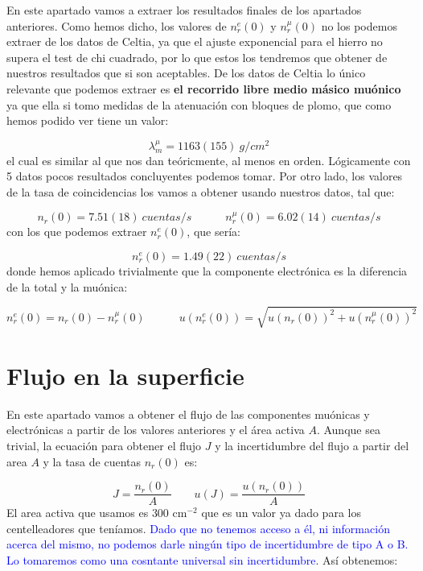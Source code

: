 \documentclass[11pt]{article}
\newcommand{\tquad}{\quad \quad \quad}
\begin{document}
En este apartado vamos a extraer los resultados finales de los apartados anteriores. Como hemos dicho, los valores de $n_r^e(0)$ y $n_r^\mu(0)$ no los podemos extraer de los datos de Celtia, ya que el ajuste exponencial para el hierro no supera el test de chi cuadrado, por lo que estos los tendremos que obtener de nuestros resultados que si son aceptables. De los datos de Celtia lo único relevante que podemos extraer es \textbf{el recorrido libre medio másico muónico} ya que ella si tomo medidas de la atenuación con bloques de plomo, que como hemos podido ver tiene un valor: 

\begin{equation}
	\lambda_m^\mu = 1163(155) \ \unit{g/cm^2}
\end{equation}
el cual es similar al que nos dan teóricmente, al menos en orden. Lógicamente con 5 datos pocos resultados concluyentes podemos tomar. Por otro lado, los valores de la tasa de coincidencias los vamos a obtener usando nuestros datos, tal que: 

\begin{equation}
	n_r(0) = 7.51(18)  \ \unit{cuentas/s}  \tquad 
	n_r^\mu (0) = 6.02(14) \ \unit{cuentas/s} 
\end{equation}
con los que podemos extraer $n_r^e(0)$, que sería: 

\begin{equation}
	n_r^e(0) = 1.49(22)  \ \unit{cuentas/s}   
\end{equation}
donde hemos aplicado trivialmente que la componente electrónica es la diferencia de la total y la muónica: 

\begin{equation}
	n_r^e (0) = n_r (0) - n_r^\mu (0) \tquad u(n_r^e(0))=\sqrt{u(n_r (0) )^2 + u(n_r^\mu (0) )^2}
\end{equation}
 
\section{Flujo en la superficie}

En este apartado vamos a obtener el flujo de las componentes muónicas y electrónicas a partir de los valores anteriores y el área activa $A$. Aunque sea trivial, la ecuación para obtener el flujo $J$ y la incertidumbre del flujo a partir del area $A$ y la tasa de cuentas $n_r(0)$ es: 

\begin{equation}
	J = \frac{n_r(0)}{A} \qquad u(J) = \frac{u(n_r(0))}{A}
\end{equation}
El area activa que usamos es $300$ cm$^{-2}$ que es un valor ya dado para los centelleadores que teníamos. \textcolor{blue}{Dado que no tenemos acceso a él, ni información acerca del mismo, no podemos darle ningún tipo de incertidumbre de tipo A o B. Lo tomaremos como una cosntante universal sin incertidumbre}. Así obtenemos:
\end{document}
